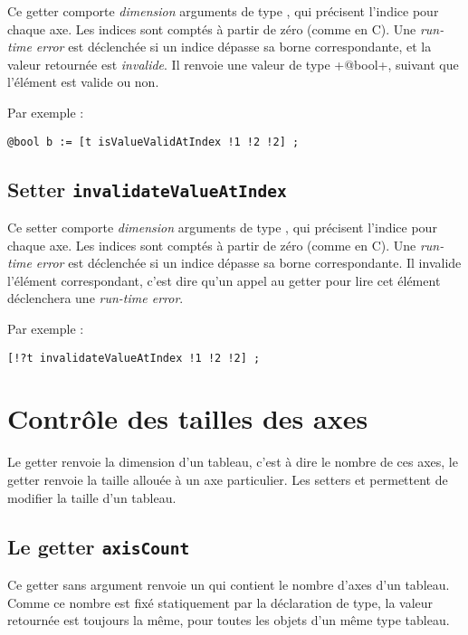 Ce getter comporte \emph{dimension} arguments de type , qui précisent l'indice pour chaque axe. Les indices sont comptés à partir de zéro (comme en C). Une \emph{run-time error} est déclenchée si un indice dépasse sa borne correspondante, et la valeur retournée est \emph{invalide}. Il renvoie une valeur de type \ggs+@bool+, suivant que l'élément est valide ou non.

Par exemple :
\begin{lstlisting}[language=galgas]
  @bool b := [t isValueValidAtIndex !1 !2 !2] ;
\end{lstlisting}


\subsection{Setter \texttt{invalidateValueAtIndex}}

Ce setter comporte \emph{dimension} arguments de type , qui précisent l'indice pour chaque axe. Les indices sont comptés à partir de zéro (comme en C). Une \emph{run-time error} est déclenchée si un indice dépasse sa borne correspondante. Il invalide l'élément correspondant, c'est dire qu'un appel au getter  pour lire cet élément déclenchera une \emph{run-time error}.

Par exemple :
\begin{lstlisting}[language=galgas]
  [!?t invalidateValueAtIndex !1 !2 !2] ;
\end{lstlisting}





\section{Contrôle des tailles des axes}

Le getter  renvoie la dimension d'un tableau, c'est à dire le nombre de ces axes, le getter  renvoie la taille allouée à un axe particulier. Les setters  et  permettent de modifier la taille d'un tableau.



\subsection{Le getter \texttt{axisCount}}

Ce getter sans argument renvoie un  qui contient le nombre d'axes d'un tableau. Comme ce nombre est fixé statiquement par la déclaration de type, la valeur retournée est toujours la même, pour toutes les objets d'un même type tableau.


